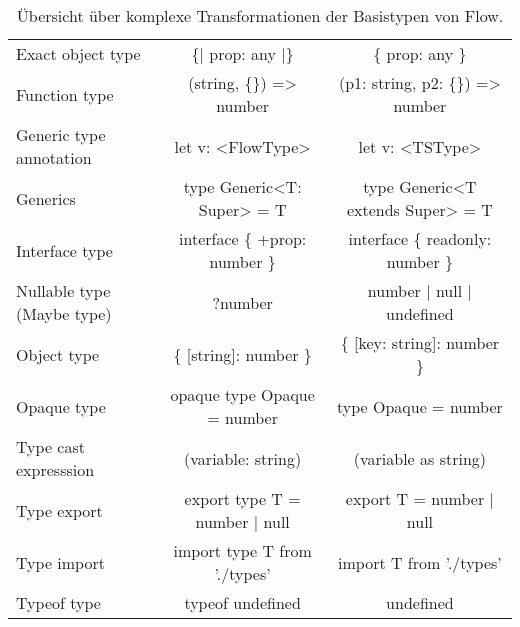 \begin{table}[tbh]
  \footnotesize
  \begin{tabu} to 
    \midrule
         &                        &                         \\
    \midrule
    Exact object type          & \{| prop: any |\}               &   \{ prop: any \}                      \\
    Function type              & (string, \{\}) => number        &   (p1: string, p2: \{\}) => number     \\
    Generic type annotation    & let v: <{}FlowType>{}           &   let v: <{}TSType>{}                  \\
    Generics                   & type Generic<{}T: Super> = T    &   type Generic<{}T extends Super> = T  \\
    Interface type             & interface \{ +prop: number \}   &   interface \{ readonly: number \}     \\
    Nullable type (Maybe type) & ?number                         &   number | null | undefined            \\
    Object type                & \{ {[}string{]}: number \}      &   \{ {[}key: string{]}: number \}      \\
    Opaque type                & opaque type Opaque = number     &   type Opaque = number                 \\
    Type cast expresssion      & (variable: string)              &   (variable as string)                 \\
    Type export                & export type T = number | null   &   export T = number | null             \\
    Type import                & import type T from './types'    &   import T from './types'              \\
    Typeof type                & typeof undefined                &   undefined                            \\
    \midrule
  \end{tabu}
  \caption{Übersicht über komplexe Transformationen der Basistypen von Flow.}
  \label{tab:transformation-base-types-complex}
\end{table}
